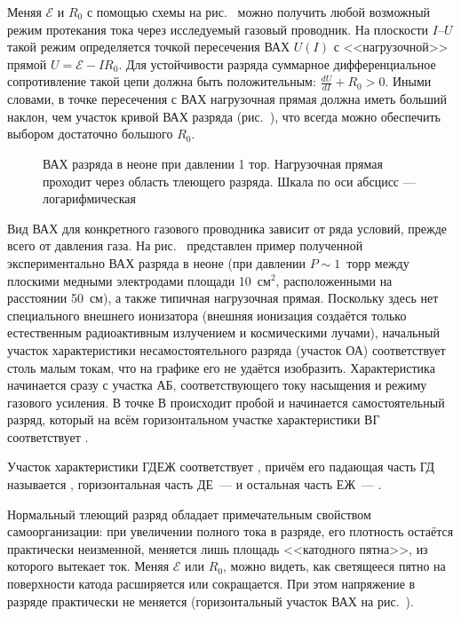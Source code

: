 Меняя $\mathcal{E}$ и $R_0$ с помощью схемы на рис.~
можно получить любой возможный режим протекания тока через исследуемый газовый проводник.
На плоскости $I$--$U$ такой режим определяется точкой пересечения ВАХ $U(I)$
с <<нагрузочной>> прямой $U=\mathcal{E}-IR_0$.
Для устойчивости разряда суммарное дифференциальное сопротивление такой цепи должна быть
положительным: $\frac{dU}{dI} + R_0 > 0$. Иными словами, в точке пересечения с ВАХ
нагрузочная прямая должна иметь больший наклон,
чем участок кривой ВАХ разряда (рис.~),
что всегда можно обеспечить выбором достаточно большого $R_0$.

\begin{figure}[h!]
    \centering
    \caption{ВАХ разряда в неоне при давлении 1 тор. Нагрузочная прямая проходит через область тлеющего разряда. Шкала по оси абсцисс --- логарифмическая}
    \label{Neon discharge VAC}
\end{figure}

Вид ВАХ для конкретного газового проводника зависит от ряда условий, прежде
всего от давления газа. На рис.~ представлен пример
полученной экспериментально ВАХ разряда в неоне (при давлении $P\sim 1$~торр
между плоскими медными электродами площади 10~см$^2$, расположенными на
расстоянии 50~см), а также типичная нагрузочная прямая. Поскольку
здесь нет специального внешнего ионизатора (внешняя ионизация создаётся только
естественным радиоактивным излучением и космическими лучами), начальный участок
характеристики несамостоятельного разряда (участок ОА) соответствует столь
малым токам, что на графике его не удаётся изобразить. Характеристика
начинается сразу с участка АБ, соответствующего току насыщения и режиму
газового усиления. В точке В происходит пробой и начинается самостоятельный
разряд, который на всём горизонтальном участке характеристики ВГ соответствует
.

Участок характеристики ГДЕЖ соответствует ,
причём его падающая часть ГД называется ,
горизонтальная часть ДЕ~---  и
остальная часть ЕЖ~--- .

Нормальный тлеющий разряд обладает примечательным свойством самоорганизации:
при увеличении полного тока в разряде, его плотность остаётся практически
неизменной, меняется лишь площадь <<катодного пятна>>, из которого вытекает ток.
Меняя $\mathcal{E}$ или $R_0$, можно видеть, как светящееся пятно
на поверхности катода расширяется или сокращается.
При этом напряжение в разряде практически не меняется
(горизонтальный участок ВАХ на рис.~).

